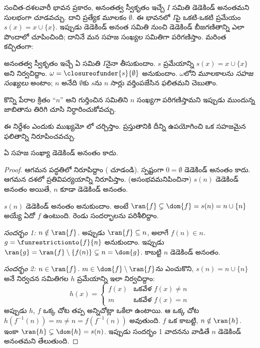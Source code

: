 \documentclass[../../../include/open-logic-section]{subfiles}
\begin{document}
సంచిత-దశలవారీ భావన ప్రకారం, అనంతత్వ స్వీకృతం ఇచ్చే
$I$ సమితి డెడెకిండ్ అనంతమని సులభంగా చూడవచ్చు. దాని ప్రత్యేక
మూలకం $\emptyset$. ఈ భావనలో $I$పై ఒకటి-ఒకటి ప్రమేయం
$s(x) = x\cup
\{x\}$.
ఇప్పుడు 
డెడెకిండ్ అనంత సమితి
నుంచి డెడెకిండ్ బీజగణితాన్ని
ఎలా పొందాలో చూపించింది;
దానినే మన సహజ సంఖ్యల
సమితిగా పరిగణిస్తాం.
మరింత కచ్చితంగా:
\begin{defn}
అనంతత్వ స్వీకృతం ఇచ్చే
ఏ సమితి $I$నైనా
తీసుకుందాం. $s$
ప్రమేయాన్ని $s(x) = x \cup \{x\}$
అని నిర్వచిద్దాం.
$\omega =
\closureofunder{s}{\emptyset}$
అనుకుందాం. $\omega$లోని
మూలకాలను \emph{సహజ
సంఖ్యలు} అంటాం; $n$
అనేది $\emptyset$కు
$s$ను $n$ సార్లు
వర్తింపజేసిన ఫలితమని
చెబుతాం.
\end{defn}

కొన్ని పేరాల క్రితం
``$n$'' అని గుర్తించిన
సమితిని $n$ సంఖ్య\emph{గా}
పరిగణిస్తామని ఇప్పుడు
ముందున్న జాబితాను తిరిగి చూసి
నిర్ధారించుకోవచ్చు.

ఈ నిర్దేశం ఎందుకు ముఖ్యమో
లో చర్చిస్తాం.
ప్రస్తుతానికి దీన్ని ఉపయోగించి ఒక సహజమైన
ఫలితాన్ని నిరూపించవచ్చు.

\begin{prop}
ఏ సహజ సంఖ్యా డెడెకిండ్
అనంతం కాదు.
\end{prop}

\begin{proof}
ఆగమన పద్ధతిలో నిరూపిద్దాం
( చూడండి). స్పష్టంగా
$0
= \emptyset$ డెడెకిండ్
అనంతం కాదు. ఆగమన
దశలో ప్రతివిపర్యయాన్ని
నిరూపిస్తాం. (అసంభవమనిపించినా)
$s(n)$ డెడెకిండ్
అనంతం అయితే, $n$
కూడా డెడెకిండ్ అనంతం.

$s(n)$ డెడెకిండ్
అనంతం అనుకుందాం.
అంటే $\ran{f}\subsetneq \dom{f} = s(n) = n \cup
\{n\}$ అయ్యే ఏదో
$f$ ఉంటుంది. రెండు
సందర్భాలను పరిశీలిద్దాం.

\emph{సందర్భం 1: $n \notin \ran{f}$.}
అప్పుడు $\ran{f} \subseteq n$,
అలాగే $f(n) \in n$.
$g = \funrestrictionto{f}{n}$
అనుకుందాం. ఇప్పుడు
$\ran{g} =
\ran{f} \setminus \{f(n)\} \subsetneq n = \dom{g}$.
కాబట్టి $n$ డెడెకిండ్
అనంతం.

\emph{సందర్భం 2: $n \in \ran{f}$.}
$m \in \dom{f} \setminus \ran{f}$ను
ఎంచుకొని,
$s(n) = n \cup \{n\}$ అనే
నిర్వచన సమితిగల $h$
ప్రమేయాన్ని ఇలా
నిర్వచిద్దాం:
\[
h(x) = 
	\begin{cases}
		f(x) & \text{ఒకవేళ }f(x) \neq n\\
		m & \text{ఒకవేళ }f(x)=n
	\end{cases}
\]
అప్పుడు $h$, $f$
ఒక్క చోట తప్ప అన్నిచోట్లా ఒకేలా
ఉంటాయి. ఆ ఒక్క చోట
$h(f^{-1}(n)) = m
\neq n = f(f^{-1}(n))$
అవుతుంది.
$f$ ఒక
కాబట్టి, $n \notin
\ran{h}$. ఇంకా
$\ran{h} \subsetneq \dom{h} = s(n)$.
ఇప్పుడు సందర్భం 1
వాదనను వాడితే $n$ డెడెకిండ్
అనంతమని తేలుతుంది.
\end{proof}
\end{document}
